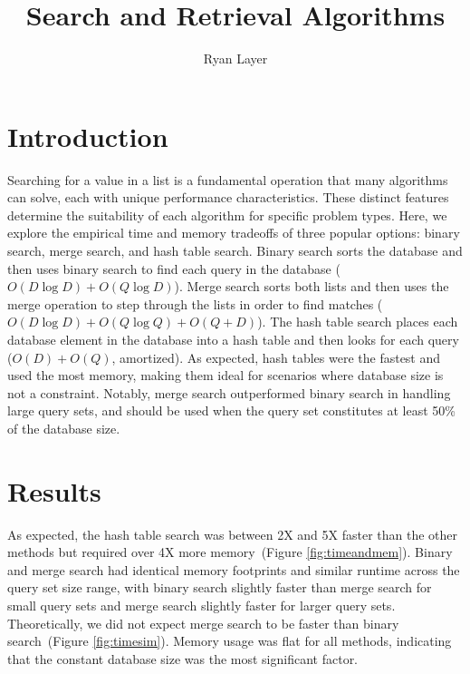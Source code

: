 \documentclass[11pt, letterpaper]{article}
\begin{document}
\title{Search and Retrieval Algorithms}
\author{Ryan Layer}
\maketitle

\section{Introduction}

Searching for a value in a list is a fundamental operation that many
algorithms can solve, each with unique performance characteristics.  These
distinct features determine the suitability of each algorithm for specific
problem types.  Here, we explore the empirical time and memory tradeoffs of
three popular options: binary search, merge search, and hash table search.
Binary search sorts the database and then uses binary search to find each
query in the database ($O(D \log D) + O(Q \log D)$). Merge search sorts both
lists and then uses the merge operation to step through the lists in order to
find matches ($O(D \log D) + O(Q \log Q) + O(Q + D)$). The hash table search
places each database element in the database into a hash table and then looks
for each query ($O(D) + O(Q)$, amortized). As expected, hash tables were the
fastest and used the most memory, making them ideal for scenarios where
database size is not a constraint. Notably, merge search outperformed binary
search in handling large query sets, and should be used when the query set
constitutes at least 50\% of the database size.

\section{Results}

As expected, the hash table search was between 2X and 5X faster than the
other methods but required over 4X more memory~(Figure \ref{fig:timeandmem}).
Binary and merge search had identical memory footprints and similar runtime
across the query set size range, with binary search slightly faster than
merge search for small query sets and merge search slightly faster for larger
query sets. Theoretically, we did not expect merge search to be faster than
binary search~(Figure \ref{fig:timesim}).
Memory usage was flat for all methods, indicating that the constant database
size was the most significant factor.
\end{document}
